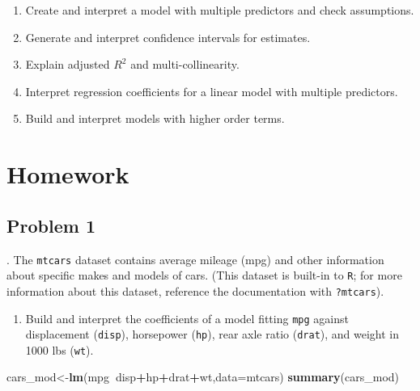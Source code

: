 \documentclass[
]{book}
\newenvironment{Shaded}{\begin{snugshade}}{\end{snugshade}}
\newcommand{\DataTypeTok}[1]{\textcolor[rgb]{0.13,0.29,0.53}{#1}}
\newcommand{\KeywordTok}[1]{\textcolor[rgb]{0.13,0.29,0.53}{\textbf{#1}}}
\newcommand{\NormalTok}[1]{#1}
\newcommand{\OperatorTok}[1]{\textcolor[rgb]{0.81,0.36,0.00}{\textbf{#1}}}
\providecommand{\tightlist}{%
  \setlength{\itemsep}{0pt}\setlength{\parskip}{0pt}}
\begin{document}
\begin{enumerate}
\def\labelenumi{\arabic{enumi})}
\tightlist
\item
  Create and interpret a model with multiple predictors and check assumptions.\\
\item
  Generate and interpret confidence intervals for estimates.\\
\item
  Explain adjusted \(R^2\) and multi-collinearity.\\
\item
  Interpret regression coefficients for a linear model with multiple predictors.\\
\item
  Build and interpret models with higher order terms.
\end{enumerate}

\hypertarget{homework-29}{%
\section{Homework}\label{homework-29}}

\hypertarget{problem-1-29}{%
\subsection{Problem 1}\label{problem-1-29}}

. The \texttt{mtcars} dataset contains average mileage (mpg) and other information about specific makes and models of cars. (This dataset is built-in to \texttt{R}; for more information about this dataset, reference the documentation with \texttt{?mtcars}).

\begin{enumerate}
\def\labelenumi{\alph{enumi}.}
\tightlist
\item
  Build and interpret the coefficients of a model fitting \texttt{mpg} against displacement (\texttt{disp}), horsepower (\texttt{hp}), rear axle ratio (\texttt{drat}), and weight in 1000 lbs (\texttt{wt}).
\end{enumerate}

\begin{Shaded}
\begin{Highlighting}[]
\NormalTok{cars_mod<-}\KeywordTok{lm}\NormalTok{(mpg}\OperatorTok{~}\NormalTok{disp}\OperatorTok{+}\NormalTok{hp}\OperatorTok{+}\NormalTok{drat}\OperatorTok{+}\NormalTok{wt,}\DataTypeTok{data=}\NormalTok{mtcars)}
\KeywordTok{summary}\NormalTok{(cars_mod)}
\end{Highlighting}
\end{Shaded}
\end{document}
